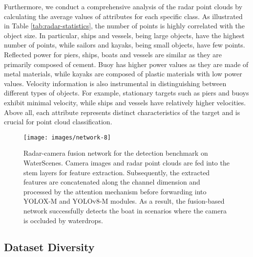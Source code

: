 \documentclass[lettersize,journal]{IEEEtran}
\begin{document}
Furthermore, we conduct a comprehensive analysis of the radar point clouds by calculating the average values of attributes for each specific class. 
As illustrated in Table \ref{tab:radar-statistics}, the number of points is highly correlated with the object size. In particular, ships and vessels, being large objects, have the highest number of points, while sailors and kayaks, being small objects, have few points.
Reflected power for piers, ships, boats and vessels are similar as they are primarily composed of cement. Buoy has higher power values as they are made of metal materials, while kayaks are composed of plastic materials with low power values.
Velocity information is also instrumental in distinguishing between different types of objects. For example, stationary targets such as piers and buoys exhibit minimal velocity, while ships and vessels have relatively higher velocities.
Above all, each attribute represents distinct characteristics of the target and is crucial for point cloud classification.


\begin{figure*}[h]
\centering
\texttt{[image: images/network-8]}
\caption{Radar-camera fusion network for the detection benchmark on WaterScenes. Camera images and radar point clouds are fed into the stem layers for feature extraction. Subsequently, the extracted features are concatenated along the channel dimension and processed by the attention mechanism before forwarding into YOLOX-M and YOLOv8-M modules. As a result, the fusion-based network successfully detects the boat in scenarios where the camera is occluded by waterdrops.}
    \label{fig:network}
\end{figure*}


\subsection{Dataset Diversity}
\end{document}
